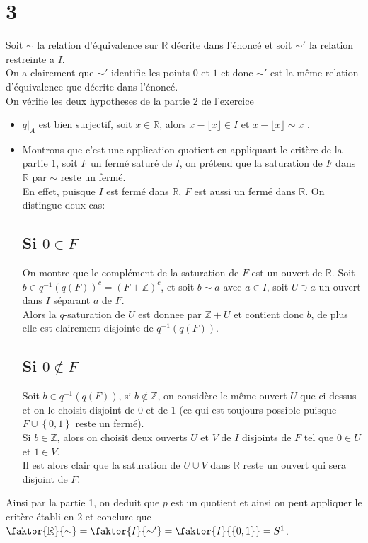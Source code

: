 \documentclass[11pt, a4paper]{article}
\begin{document}
\section*{3}
Soit $\sim $ la relation d'équivalence sur $ \mathbb{R}$ décrite dans l'énoncé et soit $\sim '$ la relation restreinte a $I$.\\
On a clairement que $\sim '$ identifie les points $0$ et $1$ et donc $\sim '$ est la même relation d'équivalence que décrite dans l'énoncé.\\
On vérifie les deux hypotheses de la partie 2 de l'exercice
\begin{itemize}
\item $q\vert_A$ est bien surjectif, soit $x\in \mathbb{R}$, alors $x- \lfloor x\rfloor\in I$ et $ x- \lfloor x \rfloor \sim x$ .
\item Montrons que c'est une application quotient en appliquant le critère de la partie 1, soit $ F$ un fermé saturé de $I$, on prétend que la saturation de $F$ dans $ \mathbb{R}$ par $\sim$  reste un fermé.\\
	En effet, puisque $I$ est fermé dans $ \mathbb{R}$, $F$ est aussi un fermé dans $ \mathbb{R}$.
	On distingue deux cas:
	\subsection*{Si $ 0 \in F$ }
	On montre que le complément de la saturation de $F$ est un ouvert de $ \mathbb{R}$.
	Soit $ b\in q^{-1}( q( F) ) ^{c} = ( F + \mathbb{Z})^{c}$, et soit $ b \sim a$ avec $a \in I$, soit $U\ni a$ un ouvert dans $I$ séparant $ a$ de $F$.\\
	Alors la $q$-saturation de $ U$ est donnee par $ \mathbb{Z}+ U$ et contient donc $b$, de plus elle est clairement disjointe de $ q^{-1}( q( F) ) $.
	\subsection*{ Si $ 0\notin F$ }
	Soit $ b \in q^{-1}( q( F) ) $, si $ b \notin \mathbb{Z}$, on considère le même ouvert $U$ que ci-dessus et on le choisit disjoint de $ 0$ et de $1$ (ce qui est toujours possible puisque $ F \cup \left\{ 0,1 \right\} $  reste un fermé).\\
	Si $ b \in \mathbb{Z}$, alors on choisit deux ouverts $U$ et $V$ de $I$ disjoints de $F$ tel que $ 0\in U$ et $ 1\in V$.\\
	Il est alors clair que la saturation de $U\cup V$ dans $ \mathbb{R}$ reste un ouvert qui sera disjoint de $F$.
	
\end{itemize}
Ainsi par la partie 1, on deduit que $ p$ est un quotient et ainsi on peut appliquer le critère établi en 2 et conclure que $\faktor  { \mathbb{R} } { \sim} = \faktor { I} { \sim '} = \faktor { I} { \left\{ 0,1 \right\}  } = S^{1}$. 
\end{document}
